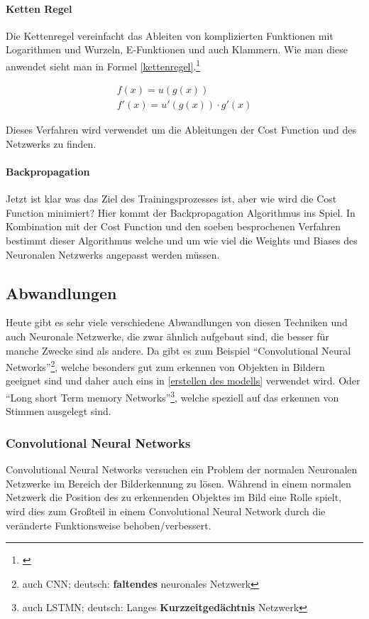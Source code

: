 \paragraph{Ketten Regel}\label{parachain}

Die Kettenregel vereinfacht das Ableiten von komplizierten Funktionen mit Logarithmen und Wurzeln, E-Funktionen und auch Klammern. Wie man diese anwendet sieht man in Formel \ref{kettenregel}.\footnote{\cite{kettenregel}}

\begin{equation}\label{kettenregel}
    \begin{matrix}
        f(x) = u(g(x))\\
        f'(x) = u'(g(x)) \cdot g'(x)
    \end{matrix}
\end{equation}

Dieses Verfahren wird verwendet um die Ableitungen der Cost Function und des Netzwerks zu finden.

\paragraph{Backpropagation}

Jetzt ist klar was das Ziel des Trainingsprozesses ist, aber wie wird die Cost Function minimiert? Hier kommt der Backpropagation Algorithmus ins Spiel. In Kombination mit der Cost Function und den soeben besprochenen Verfahren bestimmt dieser Algorithmus welche und um wie viel die Weights und Biases des Neuronalen Netzwerks angepasst werden müssen.

\subsection{Abwandlungen}

Heute gibt es sehr viele verschiedene Abwandlungen von diesen Techniken und auch Neuronale Netzwerke, die zwar ähnlich aufgebaut sind, die besser für manche Zwecke sind als andere. Da gibt es zum Beispiel "`Convolutional Neural Networks"'\footnote{auch CNN; deutsch: \textbf{faltendes} neuronales Netzwerk}, welche besonders gut zum erkennen von Objekten in Bildern geeignet sind und daher auch eins in \ref{erstellen des modells} verwendet wird. Oder "`Long short Term memory Networks"'\footnote{auch LSTMN; deutsch: Langes \textbf{Kurzzeitgedächtnis} Netzwerk}, welche speziell auf das erkennen von Stimmen ausgelegt sind.

\subsubsection{Convolutional Neural Networks}

Convolutional Neural Networks versuchen ein Problem der normalen Neuronalen Netzwerke im Bereich der Bilderkennung zu lösen. Während in einem normalen Netzwerk die Position des zu erkennenden Objektes im Bild eine Rolle spielt, wird dies zum Großteil in einem Convolutional Neural Network durch die veränderte Funktionsweise behoben/verbessert.